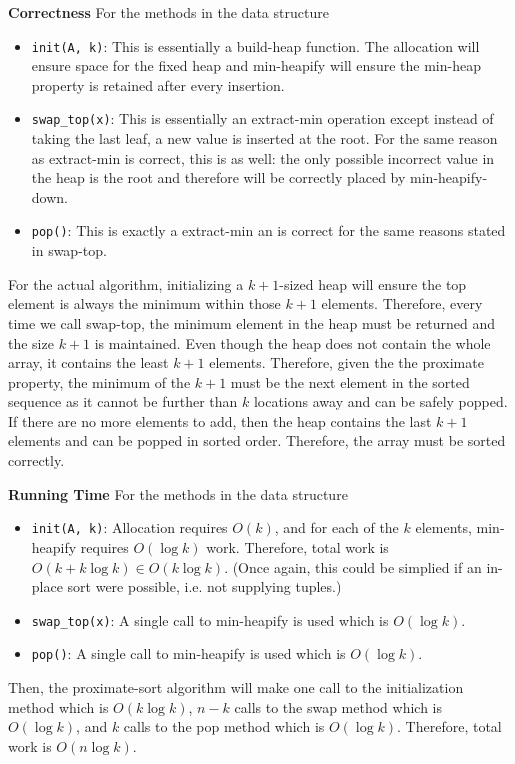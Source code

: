 \documentclass[12pt,twoside]{article}
\begin{document}
\begin{problems}
\begin{problemparts}
    \smallbreak

    {\bf Correctness} For the methods in the data structure
    \begin{itemize}
        \item {\tt init(A, k)}: This is essentially a build-heap function.
        The allocation will ensure space for the fixed heap and min-heapify
        will ensure the min-heap property is retained after every insertion.
        \item {\tt swap\_top(x)}: This is essentially an extract-min
        operation except instead of taking the last leaf, a new value is
        inserted at the root. For the same reason as extract-min is correct,
        this is as well: the only possible incorrect value in the heap is the
        root and therefore will be correctly placed by min-heapify-down.
        \item {\tt pop()}: This is exactly a extract-min an is correct for
        the same reasons stated in swap-top.
    \end{itemize}

    For the actual algorithm, initializing a $ k + 1 $-sized heap will ensure
    the top element is always the minimum within those $ k + 1 $ elements.
    Therefore, every time we call swap-top, the minimum element in the heap
    must be returned and the size $ k + 1 $ is maintained. Even though the
    heap does not contain the whole array, it contains the least $ k + 1 $
    elements. Therefore, given the the proximate property, the minimum of the
    $ k + 1 $ must be the next element in the sorted sequence as it cannot be
    further than $ k $ locations away and can be safely popped. If there are
    no more elements to add, then the heap contains the last $ k + 1 $
    elements and can be popped in sorted order. Therefore, the array must be
    sorted correctly.

    \smallbreak

    {\bf Running Time} For the methods in the data structure
    \begin{itemize}
        \item {\tt init(A, k)}: Allocation requires $ O(k) $, and for each of
        the $ k $ elements, min-heapify requires $ O(\log k) $ work.
        Therefore, total work is $ O(k + k \log k) \in O( k \log k) $. (Once
        again, this could be simplied if an in-place sort were possible, i.e.
        not supplying tuples.)
        \item {\tt swap\_top(x)}: A single call to min-heapify is used which
        is $ O(\log k) $.
        \item {\tt pop()}: A single call to min-heapify is used which is $
        O(\log k) $.
    \end{itemize}
    Then, the proximate-sort algorithm will make one call to the
    initialization method which is $ O(k \log k) $, $ n - k $ calls to the
    swap method which is $ O(\log k) $, and $ k $ calls to the pop method
    which is $ O(\log k) $. Therefore, total work is $ O(n \log k) $.


\end{problemparts}
\end{problems}
\end{document}

